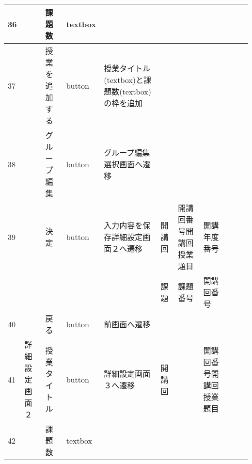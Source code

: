 \begin{landscape}
\begin{table}[]
\begin{tabular}{|l|l|l|l|l|l|l|l|l|l|l|}
36  &               & 課題数              & textbox  &                                                                   &         &                       &                    &                 &                               &                                                                \\ \hline
37  &               & 授業を追加する          & button   & 授業タイトル(textbox)と課題数(textbox)の枠を追加                                 &         &                       &                    &                 &                               &                                                                \\ \hline
38  &               & グループ編集           & button   & グループ編集選択画面へ遷移                                                     &         &                       &                    &                 &                               &                                                                \\ \hline
39  &               & 決定               & button   & 入力内容を保存詳細設定画面２へ遷移                                                 & 開講回     & 開講回番号開講回授業題目          & 開講年度番号             &                 &                               &                                                                \\ \hline
    &               &                  &          &                                                                   & 課題      & 課題番号                  & 開講回番号              &                 &                               &                                                                \\ \hline
40  &               & 戻る               & button   & 前画面へ遷移                                                            &         &                       &                    &                 &                               &                                                                \\ \hline
41  & 詳細設定画面２       & 授業タイトル           & button   & 詳細設定画面３へ遷移                                                        & 開講回     &                       & 開講回番号開講回授業題目       &                 &                               &                                                                \\ \hline
42  &               & 課題数              & textbox  &                                                                   &         &                       &                    &                 &                               &                                                                \\ \hline

\end{tabular}
\end{table}
\end{landscape}
